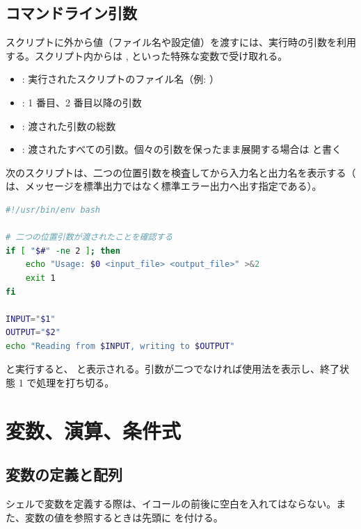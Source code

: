 \subsection{コマンドライン引数}

スクリプトに外から値（ファイル名や設定値）を渡すには、実行時の引数を利用する。スクリプト内からは ,  といった特殊な変数で受け取れる。

\begin{itemize}
    \item {}: 実行されたスクリプトのファイル名（例: ）
    \item {}: 1 番目、2 番目以降の引数
    \item \code{\$\#}: 渡された引数の総数
    \item {}: 渡されたすべての引数。個々の引数を保ったまま展開する場合は  と書く
\end{itemize}

次のスクリプトは、二つの位置引数を検査してから入力名と出力名を表示する（ は、メッセージを標準出力ではなく標準エラー出力へ出す指定である）。

\begin{lstlisting}[language=bash]
#!/usr/bin/env bash

# 二つの位置引数が渡されたことを確認する
if [ "$#" -ne 2 ]; then
    echo "Usage: $0 <input_file> <output_file>" >&2
    exit 1
fi

INPUT="$1"
OUTPUT="$2"
echo "Reading from $INPUT, writing to $OUTPUT"
\end{lstlisting}

 と実行すると、 と表示される。引数が二つでなければ使用法を表示し、終了状態 1 で処理を打ち切る。

\section{変数、演算、条件式}

\subsection{変数の定義と配列}

シェルで変数を定義する際は、イコールの前後に空白を入れてはならない。また、変数の値を参照するときは先頭に \code{\$} を付ける。

